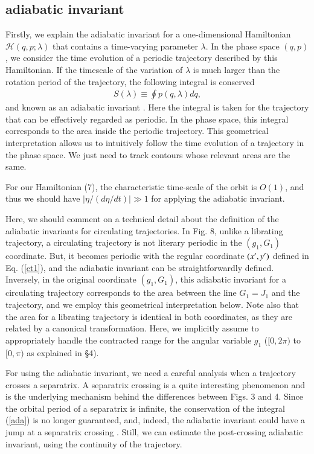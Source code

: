\documentclass[useAMS,usenatbib,twocolumn]{mn2e}
\newcommand{\beqa}{\begin{eqnarray}}
\newcommand{\eeqa}{\end{eqnarray}}
\begin{document}
\subsection{ adiabatic invariant}
Firstly, we explain the adiabatic invariant for a one-dimensional Hamiltonian $\mathcal{H}(q,p;\lambda)$ that contains a time-varying parameter $\lambda$.  In the phase space $(q,p)$,  we consider the time evolution of a periodic trajectory described by this Hamiltonian.  If the timescale of the variation of $\lambda$ is much larger than the rotation period of the trajectory, the following integral is conserved
\beqa
S(\lambda)\equiv\oint p(q,\lambda) dq, \label{ada}
\eeqa
and known as an adiabatic invariant \citep{landau1969,peale1987,ssd}.  Here the integral is taken for the trajectory that can be 
effectively regarded as periodic.  In the phase space, this integral corresponds to the area inside the periodic trajectory. 
This geometrical interpretation allows us to intuitively follow the time evolution of a trajectory in the phase space. We just need to track contours whose relevant areas are the same. 


For our Hamiltonian (7), the characteristic time-scale of the orbit is $O(1)$, and thus we should have $|\eta/(d\eta/dt)|\gg1$ for applying the adiabatic invariant.   



Here, we should comment on a technical detail about the definition of the adiabatic invariants for circulating trajectories. 
In Fig. 8, unlike a librating trajectory, a circulating trajectory is not literary periodic
in the $(g_1,G_1)$ coordinate. But, it becomes periodic with the regular coordinate $(x\rq{},y\rq{})$ defined in Eq. (\ref{ct1}), and the adiabatic invariant can be straightforwardly defined. Inversely, in the original coordinate $(g_1,G_1)$, this adiabatic invariant for a circulating  trajectory corresponds to the area between the line $G_1=J_1$ and the trajectory, and  we employ this geometrical interpretation below.  Note also that the area for a librating trajectory 
is identical in both coordinates, as they are related by a canonical transformation.  Here, we implicitly assume to appropriately handle the contracted range for the angular variable $g_1$ ($[0,2\pi)$ to $[0,\pi)$ as explained in \S 4).



For using the adiabatic invariant, we need a careful analysis when a trajectory crosses a separatrix.
 A separatrix crossing  is a quite interesting phenomenon and is the underlying mechanism behind the differences between Figs. 3 and 4.  Since the orbital period of a separatrix is infinite, the conservation of the integral  (\ref{ada}) is no longer guaranteed, and,  indeed, the adiabatic invariant could have a jump at a separatrix crossing \citep{ssd}. Still, we can estimate the post-crossing adiabatic invariant, using the continuity of the trajectory.  
\end{document}
